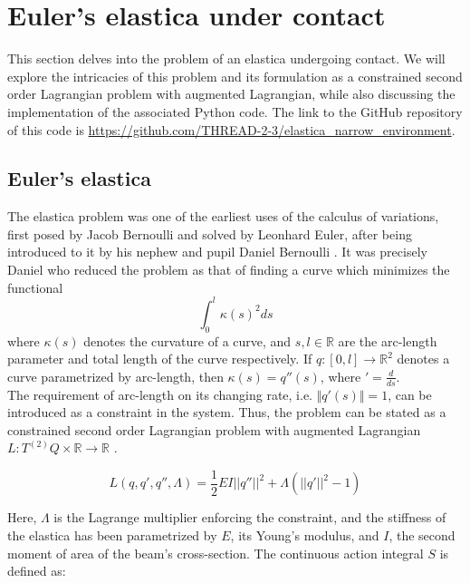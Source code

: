
\section{Euler's elastica under contact}\label{sec:elastica}
%
This section delves into the problem of an elastica undergoing contact. We will explore the intricacies of this problem and its formulation as a constrained second order Lagrangian problem with augmented Lagrangian, while also discussing the implementation of the associated Python code. The link to  the GitHub repository of this code is \url{https://github.com/THREAD-2-3/elastica_narrow_environment}. 

\subsection{Euler's elastica}
The elastica problem was one of the earliest uses of the calculus of variations, first posed by Jacob Bernoulli and solved by Leonhard Euler, after being introduced to it by his nephew and pupil Daniel Bernoulli \cite{matsutani2010}. It was precisely Daniel who reduced the problem as that of finding a curve which minimizes the functional
\begin{equation*}
    \int_0^l \kappa(s)^2 ds
\end{equation*}
where $\kappa(s)$ denotes the curvature of a curve, and $s, l \in \mathbb{R}$ are the arc-length parameter and total length of the curve respectively. If $q: [0, l] \to \mathbb{R}^2$ denotes a curve parametrized by arc-length, then $\kappa(s) = q''(s)$, where $' = \frac{d}{d s}$.\\

The requirement of arc-length on its changing rate, i.e. $\Vert q'(s) \Vert = 1$, can be introduced as a constraint in the system. Thus, the problem can be stated as a constrained second order Lagrangian problem with augmented Lagrangian $L: T^{(2)}Q \times \mathbb{R} \rightarrow \mathbb{R}$ \cite{singer2008}.

\begin{equation}\label{eq:L_static_elastica}
    L \left( q, q', q'',\Lambda\right) = \frac{1}{2} EI ||q''||^2 + \Lambda (||q'||^2-1) 
\end{equation}

Here, $\Lambda$ is the Lagrange multiplier enforcing the constraint, and the stiffness of the elastica has been parametrized by $E$, its Young's modulus, and $I$, the second moment of area of the beam's cross-section. The continuous action integral $S$ is defined as:

